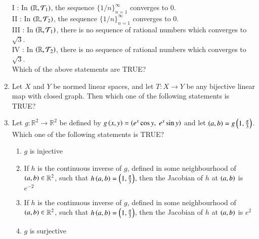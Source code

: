 \documentclass[journal,12pt,onecolumn]{IEEEtran}
\theoremstyle{remark}
\begin{document}
\begin{enumerate}[start=1, label=Q.\arabic*]
I : In $\left(\mathbb{R},\mathcal{T}_1\right)$, the sequence $\{1/n\}_{n=1}^{\infty}$ converges to $0$. \\
II : In $\left(\mathbb{R},\mathcal{T}_2\right)$, the sequence $\{1/n\}_{n=1}^{\infty}$ converges to $0$. \\
III : In $\left(\mathbb{R},\mathcal{T}_1\right)$, there is no sequence of rational numbers which converges to $\sqrt{3}$. \\
IV : In $\left(\mathbb{R},\mathcal{T}_2\right)$, there is no sequence of rational numbers which converges to $\sqrt{3}$. \\

Which of the above statements are TRUE?
\begin{enumerate}
\end{enumerate}

\hfill{}


\item Let $X$ and $Y$ be normed linear spaces, and let $T : X \to Y$ be any bijective linear map with closed graph. Then which one of the following statements is TRUE?
\begin{enumerate}
\end{enumerate}

\hfill{}


\item Let $g : \mathbb{R}^2 \to \mathbb{R}^2$ be defined by $g\left(x,y\right)=\left(e^x\cos y,\; e^x\sin y\right)$ and let $\left(a,b\right)=g\left(1,\tfrac{\pi}{3}\right)$. Which one of the following statements is TRUE?
\begin{enumerate}
\item $g$ is injective
\item If $h$ is the continuous inverse of $g$, defined in some neighbourhood of $\left(a,b\right)\in \mathbb{R}^2$, such that $h\left(a,b\right)=\left(1,\tfrac{\pi}{3}\right)$, then the Jacobian of $h$ at $\left(a,b\right)$ is $e^{-2}$
\item If $h$ is the continuous inverse of $g$, defined in some neighbourhood of $\left(a,b\right)\in \mathbb{R}^2$, such that $h\left(a,b\right)=\left(1,\tfrac{\pi}{3}\right)$, then the Jacobian of $h$ at $\left(a,b\right)$ is $e^{2}$
\item $g$ is surjective
\end{enumerate}


\end{enumerate}
\end{document}
